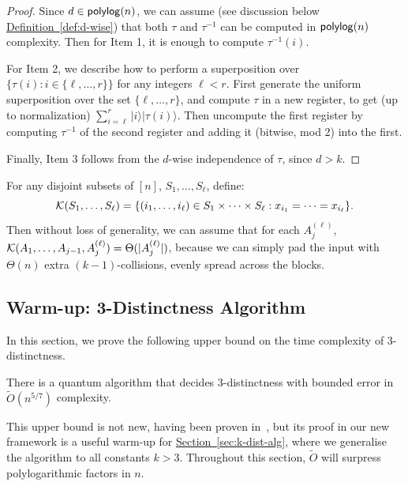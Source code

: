 \documentclass{theoretics}
\renewcommand{\sec}[1]{\hyperref[sec:#1]{Section~\ref*{sec:#1}}}
\newcommand{\defin}[1]{\hyperref[def:#1]{Definition~\ref*{def:#1}}}
\def\ket#1{{\lvert}#1\rangle}
\renewcommand{\>}{\rangle}
\newcommand{\<}{\langle}
\renewcommand{\(}{\left(}
\renewcommand{\)}{\right)}
\begin{document}
\begin{proof}
Since $d\in{\sf polylog}(n)$, we can assume (see discussion below \defin{d-wise}) that both $\tau$ and $\tau^{-1}$ can be computed in ${\sf polylog}(n)$ complexity. Then for Item 1, it is enough to compute $\tau^{-1}(i)$. 

For Item 2, we describe how to perform a superposition over $\{\tau(i):i\in \{\ell,\dots, r\}\}$ for any integers ${\ell}<r$. First generate the uniform superposition over the set $\{\ell,\dots,r\}$, and compute $\tau$ in a new register, to get (up to normalization)
$\sum_{i=\ell}^r\ket{i}\ket{\tau(i)}$.
Then uncompute the first register by computing $\tau^{-1}$ of the second register and adding it (bitwise, mod 2) into the first. 

Finally, Item 3 follows from the $d$-wise independence of $\tau$, since $d>k$. 
\end{proof}
\noindent For any disjoint subsets of $[n]$, $S_1,\dots,S_{\ell}$, define:
\begin{equation}
	{\cal K}(S_1,\dots,S_{\ell})=\{(i_1,\dots,i_{\ell})\in S_1\times\dots\times S_{\ell}: x_{i_1}=\dots=x_{i_{\ell}}\}.\label{eq:collision-set}
\end{equation}
Then without loss of generality, we can assume that for each $A_j^{(\ell)}$, ${\cal K}(A_1,\dots,A_{j-1},A_j^{(\ell)})=\Theta(|A_j^{(\ell)}|)$, because we can simply pad the input with $\Theta(n)$ extra $(k-1)$-collisions, evenly spread across the blocks.
                                                                                                                                                                                                                                                                                                                                                                                                                                                                                                                                                                                                                   


\subsection{Warm-up: 3-Distinctness Algorithm}\label{sec:3-dist}

In this section, we prove the following upper bound on the time complexity of $3$-distinctness.
\begin{theorem}\label{thm:3-dist}
There is a quantum algorithm that decides 3-distinctness with bounded error in $\widetilde{O}(n^{5/7})$ complexity.
\end{theorem}
\noindent This upper bound is not new, having been proven in~\cite{belovs2013TimeEfficientQW3Distintness}, but its proof in our new framework is a useful warm-up for \sec{k-dist-alg}, where we generalise the algorithm to all constants $k>3$. Throughout this section, $\widetilde{O}$ will surpress polylogarithmic factors in $n$. 
\end{document}
